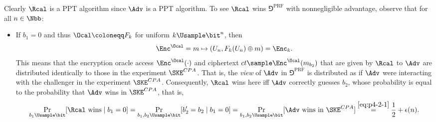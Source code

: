 \begin{answer}[ii]
    Clearly $\Rcal$ is a PPT algorithm since $\Adv$ is a PPT algorithm. To see $\Rcal$ wins $\Game^{\textrm{PRF}}$ with nonnegligible advantage, observe that for all $n\in\Nbb$:
    \begin{itemize}
        \item If $b_1=0$ and thus $\Ocal \coloneqq F_k$ for uniform $k\Usample\bit^{n}$, then \[\Enc^\Ocal = m\mapsto (U_n, F_k(U_n)\oplus m)  = \Enc_k.\] This means that the encryption oracle access $\Enc^\Ocal(\cdot)$ and ciphertext $ct\sample \Enc^\Ocal(m_{b_2})$ that are given by $\Rcal$ to $\Adv$ are distributed identically to those in the experiment $\SKE^{CPA}$.
        That is, the \textit{view} of $\Adv$ in $\Game^{\textrm{PRF}}$ is distributed as if $\Adv$ were interacting with the challenger in the experiment $\SKE^{CPA}$. Consequently, $\Rcal$ wins here iff $\Adv$ correctly guesses $b_2$, whose probability is equal to the probability that $\Adv$ wins in $\SKE^{CPA}$, that is,
        \begin{equation}\label{eq:p4-2-2}
            \Pr_{b_1\Usample\bit}[ \Rcal \textrm{ wins}\mid b_1=0]
            =\Pr_{b_1,b_2\Usample\bit}[ b_2'=b_2 \mid b_1=0]
            =\Pr_{b_1,b_2\Usample\bit}[ \Adv \textrm{ wins in } \SKE^{CPA}]
            \stackrel{\eqref{eq:p4-2-1}}= \frac{1}{2}+\epsilon(n).
        \end{equation}
        

\end{itemize}
\end{answer}
